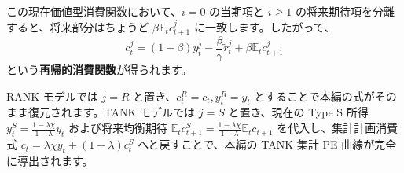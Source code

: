 \documentclass[
  japanese,
  lualatex,
  ja=standard,
  12pt,
  a4paper]{ltjsarticle}
\begin{document}
この現在価値型消費関数において、\(i=0\) の当期項と \(i \geq 1\)
の将来期待項を分離すると、将来部分はちょうど
\(\beta \mathbb{E}_t c_{t+1}^j\) に一致します。したがって、 \[
c_t^j = (1-\beta) y_t^j - \frac{\beta}{\gamma}\widetilde{r}_t^j + \beta \mathbb{E}_t c_{t+1}^j
\] という\textbf{再帰的消費関数}が得られます。

RANK モデルでは \(j=R\) と置き、\(c_t^R = c_t, y_t^R = y_t\)
とすることで本編の式がそのまま復元されます。TANK モデルでは \(j=S\)
と置き、現在の Type S 所得
\(y_t^S = \frac{1-\lambda\chi}{1-\lambda}y_t\) および将来均衡期待
\(\mathbb{E}_t c_{t+1}^S = \frac{1-\lambda\chi}{1-\lambda}\mathbb{E}_t c_{t+1}\)
を代入し、集計計画消費式 \(c_t = \lambda \chi y_t + (1-\lambda) c_t^S\)
へと戻すことで、本編の TANK 集計 PE 曲線が完全に導出されます。

\end{document}
